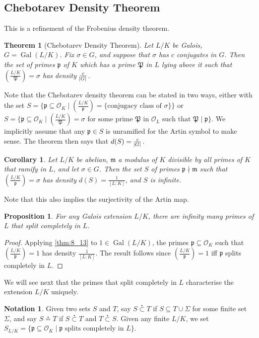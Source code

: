 \documentclass[11pt]{article}
\theoremstyle{definition}
\newtheorem{notation}[definition]{Notation}
\theoremstyle{plain}
\newtheorem{theorem}[definition]{Theorem}
\newtheorem{proposition}[definition]{Proposition}
\newtheorem{corollary}[definition]{Corollary}
\theoremstyle{remark}
\DeclareMathOperator{\Gal}{Gal}
\newcommand{\cO}{\mathcal{O}}
\newcommand{\cp}{\mathfrak{P}}
\newcommand{\fp}{\mathfrak{p}}
\newcommand{\fm}{\mathfrak{m}}
\newcommand{\leg}[2]{\left(\frac{#1}{#2}\right)}
\newcommand{\subsetdot}{\stackrel{\centerdot}{\subset}}
\newcommand{\eqdot}{\stackrel{\centerdot}{=}}
\begin{document}
\subsection{Chebotarev Density Theorem}
This is a refinement of the Frobenius density theorem.

\begin{theorem}[Chebotarev Density Theorem]\label{thm:8_13}
    Let $L/K$ be Galois, $G = \Gal(L/K)$. Fix $\sigma \in G$, and suppose that $\sigma$ has $c$ conjugates in $G$. Then the set of primes $\fp$ of $K$ which has a prime $\cp$ in $L$ lying above it such that $\leg{L/K}{\cp} = \sigma$ has density $\frac{c}{\abs{G}}$.
\end{theorem}

Note that the Chebotarev density theorem can be stated in two ways, either with the set $S = \{\fp \subseteq \cO_K \mid \leg{L/K}{\fp} = \{\text{conjugacy class of } \sigma\}\}$ or $S = \{\fp \subseteq \cO_K \mid \leg{L/K}{\cp} = \sigma \text{ for some prime } \cp \text{ in } \cO_L \text{ such that } \cp \mid \fp\}$. We implicitly assume that any $\fp \in S$ is unramified for the Artin symbol to make sense. The theorem then says that $d(S) = \frac{c}{\abs{G}}$.

\begin{corollary}\label{cor:8_14}
    Let $L/K$ be abelian, $\fm$ a modulus of $K$ divisible by all primes of $K$ that ramify in $L$, and let $\sigma \in G$. Then the set $S$ of primes $\fp \nmid \fm$ such that $\leg{L/K}{\fp} = \sigma$ has density $d(S) = \frac{1}{[L : K]}$, and $S$ is infinite.
\end{corollary}

\noindent Note that this also implies the surjectivity of the Artin map.

\begin{proposition}\label{prop:8_15}
    For any Galois extension $L/K$, there are infinity many primes of $L$ that split completely in $L$.
\end{proposition}
\begin{proof}
    Applying \autoref{thm:8_13} to $1 \in \Gal(L/K)$, the primes $\fp \subseteq \cO_K$ such that $\leg{L/K}{\fp} = 1$ has density $\frac{1}{[L:K]}$. The result follows since $\leg{L/K}{\fp} = 1$ iff $\fp$ splits completely in $L$.
\end{proof}

We will see next that the primes that split completely in $L$ characterise the extension $L/K$ uniquely.

\begin{notation}\label{not:8_16}
    Given two sets $S$ and $T$, say $S \subsetdot T$ if $S \subseteq T \cup \Sigma$ for some finite set $\Sigma$, and say $S \eqdot T$ if $S \subsetdot T$ and $T \subsetdot S$. Given any finite $L/K$, we set $S_{L/K} = \{\fp \subseteq \cO_K \mid \fp \text{ splits completely in } L\}$.
\end{notation}
\end{document}
